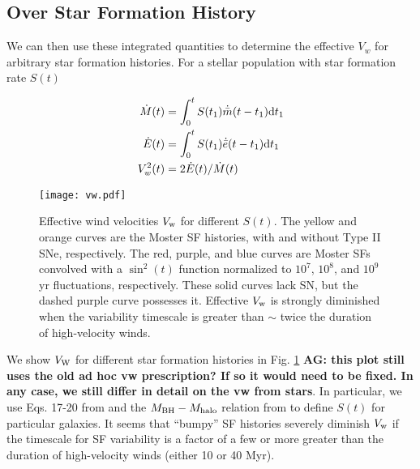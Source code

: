 \subsection{Over Star Formation History}

We can then use these integrated quantities to determine the effective
$V_w$ for arbitrary star formation histories. For a stellar population
with star formation rate $S(t)$ 

\begin{align} 
  \dot{M}(t) &= \int_0^t S(t_1) \dot{\bar{m}}(t-t_1){\rm
      d}t_1\\
  \dot{E}(t) &= \int_0^t S(t_1) \dot{\bar{e}}(t-t_1){\rm
      d}t_1\\
  V_w^2(t) &=2 \dot{E}(t)/\dot{M}(t)
\end{align}

\begin{figure}
\texttt{[image: vw.pdf]}
\caption{\label{NickPlot2} Effective wind velocities $V_{\rm w}$ for
different $S(t)$.  The yellow and orange curves are the Moster SF
histories, with and without Type II SNe, respectively.  The red,
purple, and blue curves are Moster SFs convolved with a $\sin^2(t)$
function normalized to $10^7$, $10^8$, and $10^9$ yr fluctuations,
respectively.  These solid curves lack SN, but the dashed purple curve
possesses it.  Effective $V_{\rm w}$ is strongly diminished when the
variability timescale is greater than $\sim$ twice the duration of
high-velocity winds.}
\end{figure}

We show $V_{\rm W}$ for different star formation histories in
Fig. \ref{NickPlot2} {\bf AG: this plot still uses the old ad hoc vw
  prescription? If so it would need to be fixed. In any case, we still
  differ in detail on the vw from stars}.  In particular, we use
Eqs. 17-20 from \citet{MosterNaab+:2013a} and the $M_{\rm BH}-M_{\rm
  halo}$ relation from \citet{BandaraCrampton+:2009a} to define $S(t)$
for particular galaxies.  It seems that ``bumpy'' SF histories
severely diminish $V_{\rm w}$ if the timescale for SF variability is a
factor of a few or more greater than the duration of high-velocity
winds (either 10 or 40 Myr).

